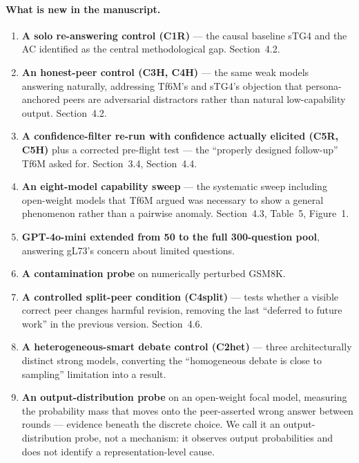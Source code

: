 \documentclass[11pt]{article}
\begin{document}
\paragraph{What is new in the manuscript.}
\begin{enumerate}\itemsep2pt
  \item \textbf{A solo re-answering control (C1R)} --- the causal baseline
        sTG4 and the AC identified as the central methodological gap. Section~4.2.
  \item \textbf{An honest-peer control (C3H, C4H)} --- the same weak models
        answering naturally, addressing Tf6M's and sTG4's objection that
        persona-anchored peers are adversarial distractors rather than natural
        low-capability output. Section~4.2.
  \item \textbf{A confidence-filter re-run with confidence actually elicited
        (C5R, C5H)} plus a corrected pre-flight test --- the ``properly designed
        follow-up'' Tf6M asked for. Section~3.4, Section~4.4.
  \item \textbf{An eight-model capability sweep} --- the systematic sweep
        including open-weight models that Tf6M argued was necessary to show a
        general phenomenon rather than a pairwise anomaly. Section~4.3,
        Table~5, Figure~1.
  \item \textbf{GPT-4o-mini extended from 50 to the full 300-question pool},
        answering gL73's concern about limited questions.
  \item \textbf{A contamination probe} on numerically perturbed GSM8K.
  \item \textbf{A controlled split-peer condition (C4split)} --- tests whether
        a visible correct peer changes harmful revision, removing the last
        ``deferred to future work'' in the previous version. Section~4.6.
  \item \textbf{A heterogeneous-smart debate control (C2het)} --- three
        architecturally distinct strong models, converting the
        ``homogeneous debate is close to sampling'' limitation into a result.
  \item \textbf{An output-distribution probe} on an open-weight focal model,
        measuring the probability mass that moves onto the peer-asserted wrong
        answer between rounds --- evidence beneath the discrete choice. We call
        it an output-distribution probe, not a mechanism: it observes output
        probabilities and does not identify a representation-level cause.
\end{enumerate}
\end{document}
